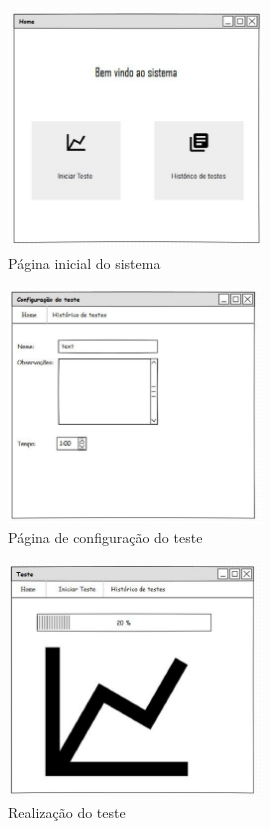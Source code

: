 	\begin{figure}[p]
		\centering
		\includegraphics[width=0.6\textwidth]{resource/home.eps}
		\caption{Página inicial do sistema}
		\label{img:home}
	\end{figure}

	\begin{figure}[p]
		\centering
		\includegraphics[width=0.6\textwidth]{resource/configteste.eps}
		\caption{Página de configuração do teste}
		\label{img:conf}
	\end{figure}
	
	\begin{figure}[p]
		\centering
		\includegraphics[width=0.6\textwidth]{resource/teste.eps}
		\caption{Realização do teste}
		\label{img:teste}
	\end{figure}

